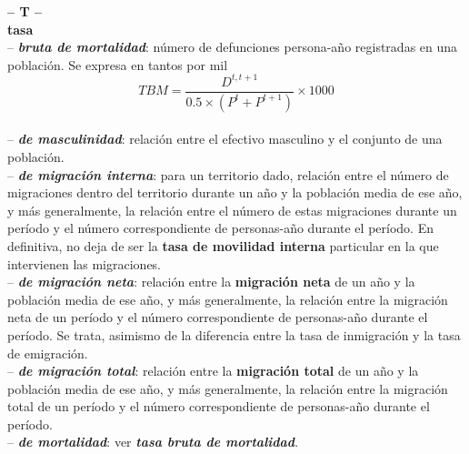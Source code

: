 \begin{multicols}{2}

\noindent\textbf{\huge{-- T --}}\\

\noindent \textbf{\Large{tasa}}\\

\vspace{-0.3cm}
-- \textbf{\textit{bruta de mortalidad}}: número de defunciones persona-año registradas en una población. Se expresa en tantos por mil $$TBM=\frac{D^{t,t+1}}{0.5\times(P^{t}+P^{t+1})}\times 1000$$\\

\vspace{-0.5cm}
-- \textbf{\textit{de masculinidad}}: relaci\'on entre el efectivo masculino y el conjunto de una poblaci\'on.\\

\vspace{-0.3cm}
-- \textbf{\textit{de migraci\'on interna}}: para un territorio dado, relaci\'on entre el n\'umero de migraciones dentro del territorio durante un a\~no y la poblaci\'on media de ese a\~no, y m\'as generalmente, la relaci\'on entre el n\'umero de estas migraciones durante un per\'iodo y el n\'umero correspondiente de personas-a\~no durante el per\'iodo. En definitiva, no deja de ser la \textbf{tasa de movilidad interna} particular en la que intervienen las migraciones.\\

\vspace{-0.3cm}
-- \textbf{\textit{de migraci\'on neta}}: relaci\'on entre la \textbf{migraci\'on neta} de un a\~no y la poblaci\'on media de ese a\~no,  y m\'as generalmente, la relaci\'on entre la migraci\'on neta de un per\'iodo y el n\'umero correspondiente de personas-a\~no durante el per\'iodo. Se trata, asimismo de la diferencia entre la tasa de inmigraci\'on y la tasa de emigraci\'on.\\

\vspace{-0.3cm}
-- \textbf{\textit{de migraci\'on total}}: relaci\'on entre la \textbf{migraci\'on total} de un a\~no y la poblaci\'on media de ese a\~no,  y m\'as generalmente, la relaci\'on entre la migraci\'on total de un per\'iodo y el n\'umero correspondiente de personas-a\~no durante el per\'iodo.\\

\vspace{-0.3cm}
-- \textbf{\textit{de mortalidad}}: ver \textbf{\textit{tasa bruta de mortalidad}}.\\


\end{multicols}
